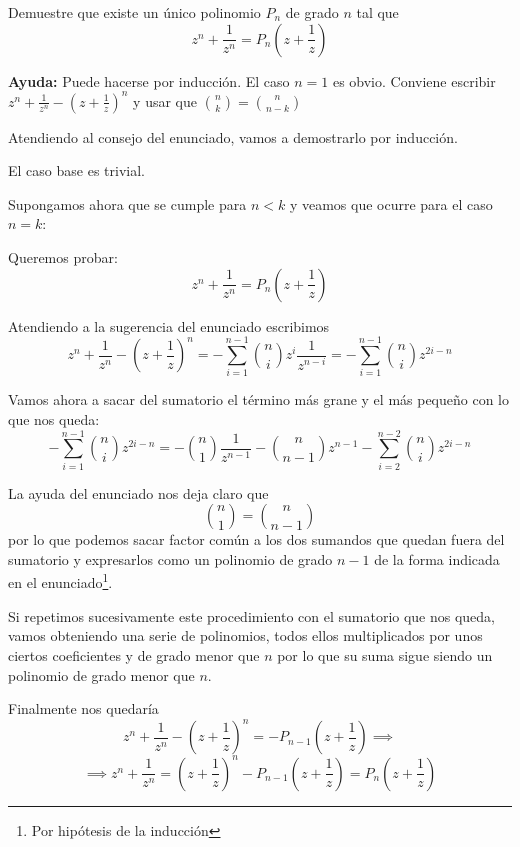 \begin{problem}[3]
Demuestre que existe un único polinomio $P_n$ de grado $n$ tal que
\[z^n+\frac{1}{z^n}=P_n\left( z + \frac{1}{z}\right)\]

\textbf{Ayuda:} Puede hacerse por inducción. El caso $n=1$ es obvio. Conviene escribir $z^n+\frac{1}{z^n}-\left( z+\frac{1}{z}\right)^n$ y usar que ${n \choose k} = {n \choose n-k}$
\solution


Atendiendo al consejo del enunciado, vamos a demostrarlo por inducción.

El caso base es trivial.

Supongamos ahora que se cumple para $n<k$ y veamos que ocurre para el caso $n=k$:

Queremos probar:
\[z^{n}+\frac{1}{z^{n}} = P_{n}\left(z+\frac{1}{z}\right)\]

Atendiendo a la sugerencia del enunciado escribimos
\[z^n+\frac{1}{z^n}-\left(z+\frac{1}{z}\right)^n = - \sum_{i=1}^{n-1}{n \choose i}z^i\frac{1}{z^{n-i}} = - \sum_{i=1}^{n-1}{n \choose i} z^{2i-n}\]

Vamos ahora a sacar del sumatorio el término más grane y el más pequeño con lo que nos queda:
\[- \sum_{i=1}^{n-1}{n \choose i} z^{2i-n} = -{n \choose 1}\frac{1}{z^{n-1}}-{n \choose n-1} z^{n-1} - \sum_{i=2}^{n-2}{n \choose i} z^{2i-n} \]

La ayuda del enunciado nos deja claro que
\[{n \choose 1} = {n \choose n-1}\]
por lo que podemos sacar factor común a los dos sumandos que quedan fuera del sumatorio y expresarlos como un polinomio de grado $n-1$ de la forma indicada en el enunciado\footnote{Por hipótesis de la inducción}.

Si repetimos sucesivamente este procedimiento con el sumatorio que nos queda, vamos obteniendo una serie de polinomios, todos ellos multiplicados por unos ciertos coeficientes y de grado menor que $n$ por lo que su suma sigue siendo un polinomio de grado menor que $n$.

Finalmente nos quedaría
\[z^n+\frac{1}{z^n}-\left(z+\frac{1}{z}\right)^n = -P_{n-1}\left(z+\frac{1}{z}\right) \implies\]
\[\implies z^n + \frac{1}{z^n} = \left(z+\frac{1}{z}\right)^n -P_{n-1}\left(z+\frac{1}{z}\right) = P_n\left(z+\frac{1}{z}\right) \]
\end{problem}

